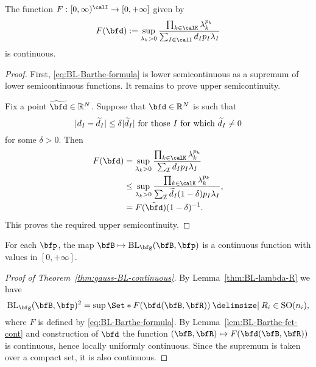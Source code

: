 \documentclass[biblatex]{pzorin-note}
\begin{document}
\begin{lemma}
\label{lem:BL-Barthe-fct-cont}
The function $F : [0,\infty)^{\calI} \to [0,+\infty]$ given by
\begin{equation}
\label{eq:BL-Barthe-formula}
F(\bfd)
:=
\sup_{\lambda_k>0} \frac{ \prod_{k\in\calK} \lambda_k^{p_k}  }{ \sum_{I \in \calI} d_I p_I \lambda_I }
\end{equation}
is continuous.
\end{lemma}

\begin{proof}
First, \eqref{eq:BL-Barthe-formula} is lower semicontinuous as a supremum of lower semicontinuous functions.
It remains to prove upper semicontinuity. 

Fix a point $\widetilde{\bfd}\in\R^N$.
Suppose that $\bfd\in\R^N$ is such that
\[
\lvert d_{I}-\widetilde{d}_{I}\rvert \leq \delta \lvert\widetilde{d}_{I}\rvert
\text{ for those } I \text{ for which } \widetilde{d}_{I} \neq 0
\]
for some $\delta>0$.
Then
\begin{align*}
F(\bfd)
&=
\sup_{\lambda_k>0} \frac{ \prod_{k\in\calK} \lambda_k^{p_k} }{ \sum_{\mathcal{I}} d_I p_I\lambda_I}
\\ &\leq
\sup_{\lambda_k>0} \frac{ \prod_{k\in\calK} \lambda_k^{p_k} }{ \sum_{\mathcal{I}} \widetilde{d}_I(1-\delta) p_I\lambda_I},
\\ &=
F(\tilde{\bfd}) ( 1-\delta )^{-1}.
\end{align*}
This proves the required upper semicontinuity.
\end{proof}

\begin{theorem}
\label{thm:gauss-BL-continuous}
For each $\bfp$,  the map $\bfB \mapsto \BL_{\bfg}(\bfB,\bfp)$ is a continuous function with values in $[0,+\infty]$.
\end{theorem}

\begin{proof}[Proof of Theorem~\ref{thm:gauss-BL-continuous}]
By Lemma~\ref{thm:BL-lambda-R} we have
\[
\BL_{\bfg}(\bfB,\bfp)^{2} = \sup \Set*{
F(\bfd(\bfB,\bfR)) \given  R_i \in \mathrm{SO}(n_i) },
\]
where $F$ is defined by \eqref{eq:BL-Barthe-formula}.
By Lemma~\ref{lem:BL-Barthe-fct-cont} and construction of $\bfd$ the function $(\bfB,\bfR) \mapsto F(\bfd(\bfB,\bfR))$ is continuous, hence locally uniformly continuous.
Since the supremum is taken over a compact set, it is also continuous.
\end{proof}
\end{document}
